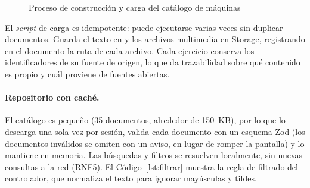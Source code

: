 \begin{figure}[H]
\centering
{}
\caption{Proceso de construcción y carga del catálogo de máquinas}
\label{fig:pipeline-catalogo}
\end{figure}

El \emph{script} de carga es idempotente: puede ejecutarse varias veces sin
duplicar documentos. Guarda el texto en  y los
archivos multimedia en Storage, registrando en el documento la ruta de cada
archivo. Cada ejercicio conserva los identificadores de su fuente de origen,
lo que da trazabilidad sobre qué contenido es propio y cuál proviene de
fuentes abiertas.

\paragraph{Repositorio con caché.} El catálogo es pequeño (35 documentos,
alrededor de 150~KB), por lo que  lo descarga una
sola vez por sesión, valida cada documento con un esquema Zod (los documentos
inválidos se omiten con un aviso, en lugar de romper la pantalla) y lo
mantiene en memoria. Las búsquedas y filtros se resuelven localmente, sin
nuevas consultas a la red (RNF5). El Código~\ref{lst:filtrar} muestra la regla
de filtrado del controlador, que normaliza el texto para ignorar mayúsculas y
tildes.

